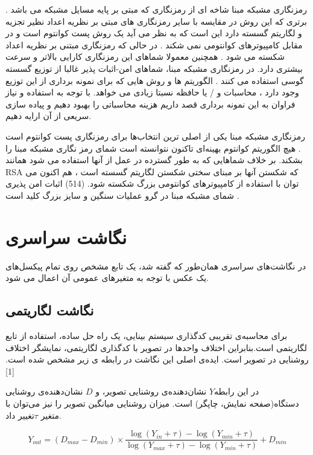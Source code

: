 

رمزنگاری مشبکه مبنا شاخه ای از رمزنگاری که مبتی بر پایه مسایل مشبکه می باشد . برتری که این روش در مقایسه با سایر رمزنگاری های مبتی بر نظریه اعداد نظیر تجزیه و لگاریتم گسسته دارد این است که به نظر می آید یک روش پست کوانتوم است و در مقابل کامپیوترهای کوانتومی نمی شکند . در حالی که رمزنگاری مبتنی بر نظریه اعداد شکسته می شود . همچنین معمولا شماهای این رمزنگاری کارایی بالاتر و سرعت بیشتری دارد.  در رمزنگاری مشبکه مبنا، شماهای امن-اثبات پذیر غالبا از توزیع گسسته گوسی استفاده می کنند . الگوریتم ها و روش هایی که برای نمونه برداری از این توزیع وجود دارد ، محاسبات و / یا حافظه نسبتا زیادی می خواهد. با توجه به استفاده و نیاز فراوان به این نمونه برداری قصد داریم هزینه محاسباتی را بهبود دهیم و پیاده سازی سریعی از آن ارایه دهیم. 


رمزنگاری مشبکه مبنا یکی از اصلی ترین انتخاب‌ها برای رمزنگاری پست کوانتوم است . هیچ الگوریتم کوانتوم بهینه‌ای تاکنون نتوانسته است شمای رمز نگاری مشبکه مبنا را بشکند. بر خلاف شماهایی که به طور گسترده در عمل از آنها استفاده می شود همانند RSA  که شکستن آنها بر مبنای سختی شکستن لگاریتم گسسته است ، هم اکنون می توان با استفاده از کامپیوترهای کوانتومی بزرگ شکسته شود. (514) اثبات امن پذیری شمای مشبکه مبنا در گرو عملیات سنگین و سایز بزرگ کلید است . 











\section{نگاشت سراسری}

در نگاشت‌های سراسری همان‌طور که گفته شد، یک تابع مشخص روی تمام پیکسل‌های یک عکس با توجه به متغیرهای عمومی آن اعمال می شود.

\subsection{نگاشت لگاریتمی}
برای محاسبه‌ی تقریبی کدگذاری سیستم بینایی، یک راه حل ساده، استفاده از تابع لگاریتمی است.بنابراین اختلاف واحدها در تصویر با کدگذاری لگاریتمی، نمایشگر اختلاف روشنایی در تصویر است. ایده‌ی اصلی این نگاشت در رابطه ی زیر مشخص شده است. [1] 

در این رابطه$Y$  نشان‌دهنده‌ی روشنایی تصویر، و $D$  نشان‌دهنده‌ی روشنایی دستگاه(صفحه نمایش، چاپگر) است.
میزان روشنایی میانگین تصویر را نیز می‌توان با متغیر $\tau $تغییر داد.

\begin{equation}
Y_{out}  = (D_{max} - D_{min}) \times
 \frac{\log( Y_{in} + \tau) - \log(Y_{min} + \tau)}{\log( Y_{max} + \tau) - \log(Y_{min} + \tau)} 
+ D_{min}
\end{equation}

